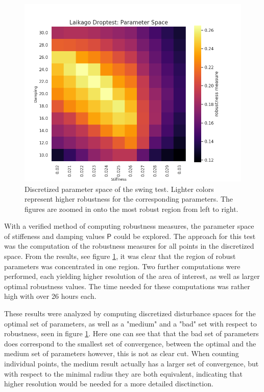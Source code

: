 \begin{figure}[h]
\begin{minipage}{0.33\textwidth}
        \end{minipage}
        \begin{minipage}{0.33\textwidth}
            \centering
            \includegraphics[width=\textwidth]{figures/droptest_ps_zoom2_correct.png} %
        \end{minipage}

    \caption[Discretized Parameter Space, Drop Test]{Discretized parameter space of the swing test. Lighter colors represent higher robustness for the corresponding parameters. The figures are zoomed in onto the most robust region from left to right.}
    \label{fig:dropps}
    \end{figure}

    With a verified method of computing robustness measures, the parameter space of stiffeness and damping values $\mathsf{P}$ could be explored. The approach for this test was the computation of the robustness measures for all points in the  discretized space. From the results, see figure \ref{fig:dropps}, it was clear that the region of robust parameters was concentrated in one region. Two further computations were performed, each yielding higher resolution of the area of interest, as well as larger optimal robustness values. The time needed for these computations was rather high with over 26 hours each. 

    These results were analyzed by computing discretized disturbance spaces for the optimal set of parameters, as well as a "medium" and a "bad" set with respect to robustness, seen in figure \ref{fig:dropps}. Here one can see that that the bad set of parameters does correspond to the smallest set of convergence, between the optimal and the medium set of parameters however, this is not as clear cut. When counting individual points, the medium result actually has a larger set of convergence, but with respect to the minimal radius they are both equivalent, indicating that higher resolution would be needed for a more detailed disctinction. 

